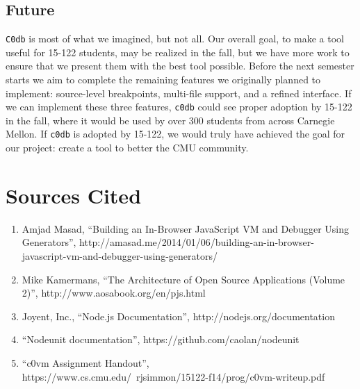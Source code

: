 \documentclass[11pt]{article}
\begin{document}
\subsection{Future}
{\tt C0db} is most of what we imagined, but not all. Our overall goal, to make a
tool useful for 15-122 students, may be realized in the fall, but we have more
work to ensure that we present them with the best tool possible. Before the next
semester starts we aim to complete the remaining features we originally planned
to implement: source-level breakpoints, multi-file support, and a refined
interface. If we can implement these three features, {\tt c0db} could see proper
adoption by 15-122 in the fall, where it would be used by over 300 students from
across Carnegie Mellon. If {\tt c0db} is adopted by 15-122, we would truly have
achieved the goal for our project: create a tool to better the CMU community.

\section{Sources Cited}
\begin{enumerate}
\item Amjad Masad,
  ``Building an In-Browser JavaScript VM and Debugger Using Generators'',
  http://amasad.me/2014/01/06/building-an-in-browser-javascript-vm-and-debugger-using-generators/
\item Mike Kamermans, ``The Architecture of Open Source Applications (Volume 2)'',
  http://www.aosabook.org/en/pjs.html
\item Joyent, Inc., ``Node.js Documentation'',
  http://nodejs.org/documentation
\item ``Nodeunit documentation'',
    https://github.com/caolan/nodeunit
\item ``c0vm Assignment Handout'',\\
    https://www.cs.cmu.edu/~rjsimmon/15122-f14/prog/c0vm-writeup.pdf
\end{enumerate}
\end{document}
